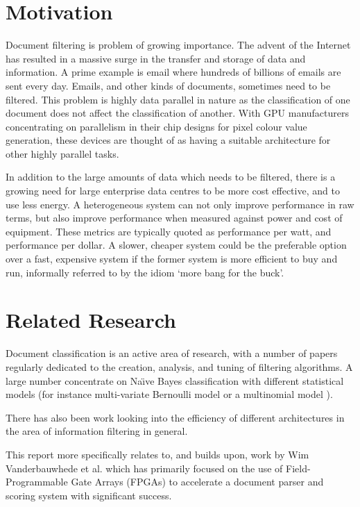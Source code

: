 \section{Motivation}

Document filtering is problem of growing importance. The advent of the Internet
has resulted in a massive surge in the transfer and storage of data and
information. A prime example is email where hundreds of billions of emails are
sent every day. Emails, and other kinds of documents, sometimes need to be
filtered. This problem is highly data parallel in nature as the classification
of one document does not affect the classification of another. With GPU
manufacturers concentrating on parallelism in their chip designs for pixel
colour value generation, these devices are thought of as having a suitable
architecture for other highly parallel tasks.

In addition to the large amounts of data which needs to be filtered, there is a
growing need for large enterprise data centres to be more cost effective, and to
use less energy. A heterogeneous system can not only improve performance in raw
terms, but also improve performance when measured against power and cost of
equipment. These metrics are typically quoted as performance per watt, and
performance per dollar. A slower, cheaper system could be the preferable option
over a fast, expensive system if the former system is more efficient to buy and
run, informally referred to by the idiom `more bang for the buck'.

\section{Related Research}
\label{sec:relatedResearch}

Document classification is an active area of research, with a number of papers
regularly dedicated to the creation, analysis, and tuning of filtering
algorithms. A large number concentrate on Na{\"{\i}}ve Bayes classification
\cite{androutsopoulos2000evaluation} \cite{androutsopoulos2000learning}  with
different statistical models (for instance multi-variate Bernoulli model
\cite{Schneider:2003:CEM:1067807.1067848} or a multinomial model
\cite{mccallum1998comparison}).

There has also been work looking into the efficiency of different architectures
in the area of information filtering \cite{chen2012invited}
\cite{he2013massively} in general.

This report more specifically relates to, and builds upon, work by Wim
Vanderbauwhede et al. which has primarily focused on the use of Field-
Programmable Gate Arrays (FPGAs) to accelerate a document parser and scoring
system \cite{vanderbauwhede2013high} \cite{HybridCPUFPGA}
\cite{chalamalasetti2012evaluating} with significant success.

